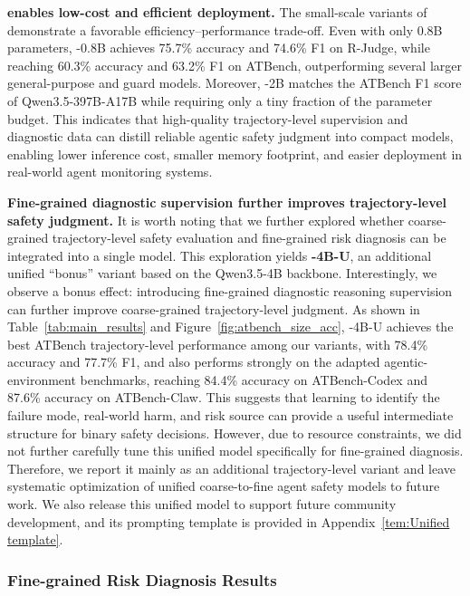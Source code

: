 \textbf{\agentdog{} enables low-cost and efficient deployment.}
    The small-scale variants of \agentdog{} demonstrate a favorable
    efficiency--performance trade-off. Even with only 0.8B parameters,
    \agentdog{}-0.8B achieves 75.7\% accuracy and 74.6\% F1 on R-Judge, while
    reaching 60.3\% accuracy and 63.2\% F1 on ATBench, outperforming several
    larger general-purpose and guard models. Moreover, \agentdog{}-2B
    matches the ATBench F1 score of Qwen3.5-397B-A17B while requiring only a
    tiny fraction of the parameter budget. This indicates that high-quality
    trajectory-level supervision and diagnostic data can distill reliable
    agentic safety judgment into compact models, enabling lower inference
    cost, smaller memory footprint, and easier deployment in real-world agent
    monitoring systems.


\textbf{Fine-grained diagnostic supervision further improves trajectory-level safety judgment.}
It is worth noting that we further explored whether coarse-grained
trajectory-level safety evaluation and fine-grained risk diagnosis can be
integrated into a single model. This exploration yields
\textbf{\agentdog{}-4B-U}, an additional unified ``bonus'' variant based on the
Qwen3.5-4B backbone. Interestingly, we observe a bonus effect: introducing
fine-grained diagnostic reasoning supervision can further improve coarse-grained
trajectory-level judgment. As shown in Table~\ref{tab:main_results} and
Figure~\ref{fig:atbench_size_acc}, \agentdog{}-4B-U achieves the best
ATBench trajectory-level performance among our variants, with 78.4\%
accuracy and 77.7\% F1, and also performs strongly on the adapted
agentic-environment benchmarks, reaching 84.4\% accuracy on ATBench-Codex
and 87.6\% accuracy on ATBench-Claw. This suggests that
learning to identify the failure mode, real-world harm, and risk source can
provide a useful intermediate structure for binary safety decisions. However, due to resource constraints, we did not further carefully tune this unified model
specifically for fine-grained diagnosis. Therefore, we report it mainly as
an additional trajectory-level variant and leave systematic optimization of
unified coarse-to-fine agent safety models to future work. We also release this unified model
to support future community development, and its prompting template is provided
in Appendix~\ref{tem:Unified template}.

\subsubsection{Fine-grained Risk Diagnosis Results}

